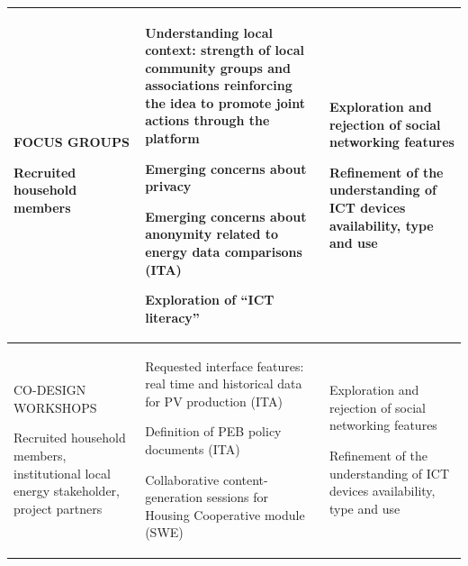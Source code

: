 \begin{table}
\begin{tabular}{>{\centering\arraybackslash}m{5.3cm}>{\centering\arraybackslash}m{6.5cm}>{\centering\arraybackslash}m{7cm}}
FOCUS GROUPS \par
Recruited household members 
&  \savespace \begin{compactitem}
 	\item Understanding local context: strength of local community groups and associations reinforcing the idea to promote joint actions through the platform 
 	\item Emerging concerns about privacy
 	\item Emerging concerns about anonymity related to energy data comparisons (ITA)
 	\item Exploration of ``ICT literacy''
 \end{compactitem} \vspace*{-.3cm} \vspace*{-.2cm}
  &  \savespace \begin{compactitem}
   	\item Exploration and rejection of social networking features
	\item Refinement of the understanding of ICT devices availability, type and use
   \end{compactitem}  \vspace*{-.3cm} \vspace*{-.2cm}  \\  \hline\noalign{\smallskip}
CO-DESIGN WORKSHOPS \par
Recruited household members, institutional local energy stakeholder, project partners \vspace*{-.3cm}
&   \savespace  \begin{compactitem}
   	\item Requested interface features: real time and historical data for PV production (ITA)
   	\item Definition of PEB policy documents (ITA)
   	\item Collaborative content-generation sessions for Housing Cooperative module (SWE)
   \end{compactitem} \vspace*{-.3cm} \vspace*{-.2cm}
   &  \savespace \begin{compactitem}
      	\item Exploration and rejection of social networking features
   	\item Refinement of the understanding of ICT devices availability, type and use
      \end{compactitem}  \vspace*{-.3cm} \vspace*{-.2cm}

\end{tabular}
\end{table}
